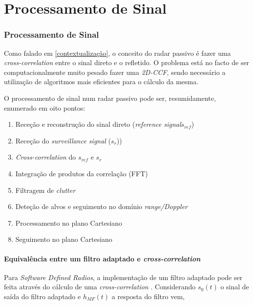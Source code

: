 
\chapter{Processamento de Sinal} %
\label{chap:Chapter4} %


\subsection{Processamento de Sinal}
Como falado em \ref{contextualização}, o conceito do radar passivo é fazer uma \textit{cross-correlation} entre o sinal direto e o refletido. O problema está no facto de ser computacionalmente muito pesado fazer uma \textit{\gls{2D-CCF}}, sendo necessário a utilização de algoritmos mais eficientes para o cálculo da mesma.\par
O processamento de sinal num radar passivo pode ser, resumidamente, enumerado em oito pontos:
\begin{enumerate}
	\item Receção e reconstrução do sinal direto (\textit{reference signal}$s_{ref}$)
	\item Receção do \textit{surveillance signal} ($s_{r}$))
	\item \textit{Cross-correlation} do $s_{ref}$ e $s_{r}$
	\item Integração de produtos da correlação (FFT)
	\item Filtragem de \textit{clutter}
	\item Deteção de alvos e seguimento no domínio \textit{range/Doppler}
	\item Processamento no plano Cartesiano
	\item Seguimento no plano Cartesiano
\end{enumerate}

\subsubsection*{Equivalência entre um filtro adaptado e \textit{cross-correlation}}

Para \textit{Software Defined Radios}, a implementação de um filtro adaptado pode ser feita através do cálculo de uma \textit{cross-correlation} \parencite{Martorella}. Considerando $s_{0}(t)$ o sinal de saída do filtro adaptado e $h_{MF}(t)$ a resposta do filtro vem, 

